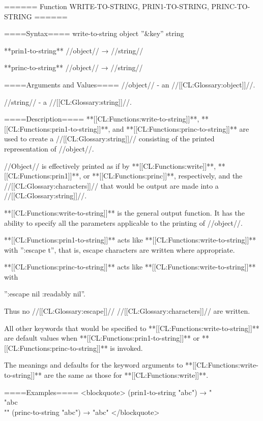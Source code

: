 ====== Function WRITE-TO-STRING, PRIN1-TO-STRING, PRINC-TO-STRING ======

====Syntax====
\DefunWithValuesNewline write-to-string {object ''&key'' \writekeys{}} {string}

**prin1-to-string** //object// → //string//

**princ-to-string** //object// → //string//

====Arguments and Values====
//object// - an //[[CL:Glossary:object]]//.

\writekeydescriptions{}

//string// - a //[[CL:Glossary:string]]//.

====Description====
**[[CL:Functions:write-to-string]]**, **[[CL:Functions:prin1-to-string]]**, and **[[CL:Functions:princ-to-string]]** are used to create a //[[CL:Glossary:string]]// consisting of the printed representation of //object//.

//Object// is effectively printed as if by **[[CL:Functions:write]]**, **[[CL:Functions:prin1]]**, or **[[CL:Functions:princ]]**, respectively, and the //[[CL:Glossary:characters]]// that would be output are made into a //[[CL:Glossary:string]]//.

**[[CL:Functions:write-to-string]]** is the general output function. It has the ability to specify all the parameters applicable to the printing of //object//.

**[[CL:Functions:prin1-to-string]]** acts like **[[CL:Functions:write-to-string]]** with '':escape t'', that is, escape characters are written where appropriate.

**[[CL:Functions:princ-to-string]]** acts like **[[CL:Functions:write-to-string]]** with

'':escape nil :readably nil''.

Thus no //[[CL:Glossary:escape]]// //[[CL:Glossary:characters]]// are written.

All other keywords that would be specified to **[[CL:Functions:write-to-string]]** are default values when **[[CL:Functions:prin1-to-string]]** or **[[CL:Functions:princ-to-string]]** is invoked.

The meanings and defaults for the keyword arguments to **[[CL:Functions:write-to-string]]** are the same as those for **[[CL:Functions:write]]**.

====Examples====
<blockquote> (prin1-to-string "abc") → "\\"abc\\"" (princ-to-string "abc") → "abc" </blockquote>

